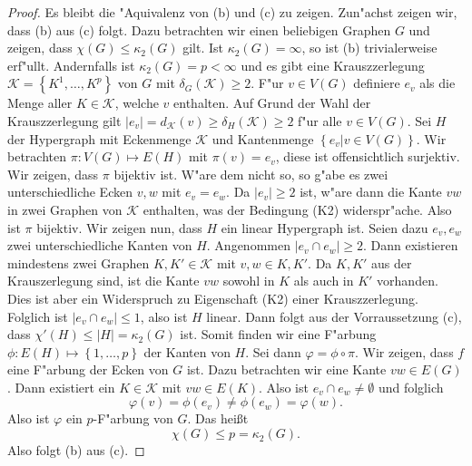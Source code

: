 \begin{proof}
  Es bleibt die "Aquivalenz von (b) und (c) zu zeigen. 
  Zun"achst zeigen wir, dass (b) aus (c) folgt. Dazu betrachten wir einen beliebigen Graphen $G$ und zeigen, dass $\chi(G) \leq \kappa_{2}(G)$ gilt. Ist $\kappa_{2}(G) = \infty$, so ist (b) trivialerweise erf"ullt. Andernfalls ist $\kappa_{2}(G) = p < \infty $ und es gibt eine Krauszzerlegung $\mathcal{K}= \left\{ K^{1},\dots,K^{p} \right\}$ von $G$ mit $\delta_{G}(\mathcal{K}) \geq 2 $.  
  F"ur $v\in V(G)$ definiere $e_v$ als die Menge aller $K\in \mathcal{K}$, welche $v$ enthalten. Auf Grund der Wahl der Krauszzerlegung gilt $|e_v| = d_{\mathcal{K}}(v)\geq \delta_{H}(\mathcal{K}) \geq 2$ f"ur alle $v \in V(G)$. Sei $H$ der Hypergraph mit Eckenmenge $\mathcal{K}$ und Kantenmenge $\left\{ e_v| v\in V(G) \right\}$. Wir betrachten $\pi: V(G) \mapsto E(H)$ mit $\pi(v) = e_v$, diese ist offensichtlich surjektiv. Wir zeigen, dass $\pi$ bijektiv ist. W"are dem nicht so, so g"abe es zwei unterschiedliche Ecken $v,w$ mit $e_v = e_w$. 
  Da $|e_v| \geq 2$ ist,  w"are dann die Kante $vw$ in zwei Graphen von $\mathcal{K}$ enthalten, was der Bedingung (K2) widerspr"ache. Also ist $\pi$ bijektiv.
  Wir zeigen nun, dass $H$ ein linear Hypergraph ist. 
  Seien dazu $e_{v},e_{w} $ zwei unterschiedliche Kanten von $H$.
  Angenommen $|e_{v}\cap e_{w}| \geq 2$. Dann existieren mindestens zwei Graphen $K,K' \in \mathcal{K}$ mit $v,w \in K,K'$. Da $K,K'$ aus der Krauszerlegung sind, ist die Kante $vw$ sowohl in $K$ als auch in $K'$ vorhanden. Dies ist aber ein Widerspruch zu Eigenschaft (K2) einer Krauszzerlegung.
  Folglich ist $|e_{v}\cap e_{w}| \leq 1$, also ist $H$ linear. Dann folgt aus der Vorraussetzung (c), dass $\chi'(H) \leq |H| = \kappa_{2}(G)$ ist.
  Somit finden wir eine F"arbung $\phi : E(H) \mapsto \left\{ 1,\dots,p \right\}$ der Kanten von $H$. Sei dann $\varphi =  \phi \circ \pi$. Wir zeigen, dass $f$ eine F"arbung der Ecken von $G$ ist. Dazu betrachten wir eine Kante $vw\in E(G)$. Dann existiert ein $K\in \mathcal{K}$ mit $vw\in E(K)$. Also ist $e_v\cap e_w \neq \emptyset$ und folglich \begin{equation*}
    \varphi(v) = \phi(e_v) \neq \phi(e_w) = \varphi(w).
  \end{equation*} 
  Also ist $\varphi$ ein $p$-F"arbung von $G$. Das hei{\ss}t
  \begin{equation*}
    \chi(G) \leq p = \kappa_{2}(G).
  \end{equation*}
  Also folgt (b) aus (c).


\end{proof}
